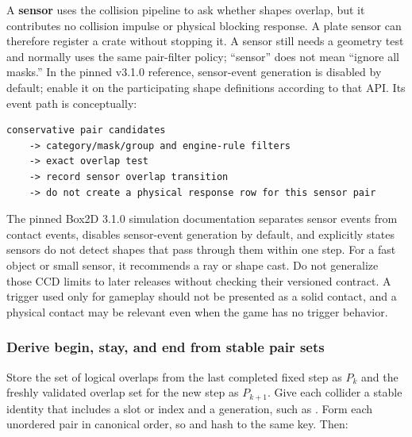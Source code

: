 \hypertarget{05-engine-i-ch017-a-sensor-detects-overlap-and-skips-physical-response}{}

A \textbf{sensor} uses the collision pipeline to ask whether shapes overlap, but it contributes no collision impulse or physical blocking response. A plate sensor can therefore register a crate without stopping it. A sensor still needs a geometry test and normally uses the same pair-filter policy; ``sensor'' does not mean ``ignore all masks.'' In the pinned v3.1.0 reference, sensor-event generation is disabled by default; enable it on the participating shape definitions according to that API. Its event path is conceptually:

\begin{verbatim}
conservative pair candidates
    -> category/mask/group and engine-rule filters
    -> exact overlap test
    -> record sensor overlap transition
    -> do not create a physical response row for this sensor pair
\end{verbatim}

The pinned Box2D 3.1.0 simulation documentation separates sensor events from contact events, disables sensor-event generation by default, and explicitly states sensors do not detect shapes that pass through them within one step. For a fast object or small sensor, it recommends a ray or shape cast. Do not generalize those CCD limits to later releases without checking their versioned contract. A trigger used only for gameplay should not be presented as a solid contact, and a physical contact may be relevant even when the game has no trigger behavior.

\subsubsection{Derive begin, stay, and end from stable pair sets}\label{05-engine-i-ch017-derive-begin-stay-and-end-from-stable-pair-sets}

\hypertarget{05-engine-i-ch017-derive-begin-stay-and-end-from-stable-pair-sets}{}

Store the set of logical overlaps from the last completed fixed step as \(P_k\) and the freshly validated overlap set for the new step as \(P_{k+1}\). Give each collider a stable identity that includes a slot or index and a generation, such as . Form each unordered pair in canonical order, so  and  hash to the same key. Then:

